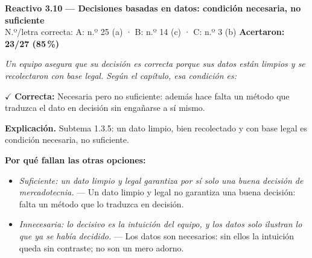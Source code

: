 \documentclass[10pt,letterpaper]{article}
\begin{document}
\begin{minipage}{\textwidth}
{\color{guinda}\textbf{Reactivo 3.10}} \textbf{— Decisiones basadas en datos: condición necesaria, no suficiente}\\[-1pt]
{\scriptsize N.º/letra correcta: A: n.º 25 (a) · B: n.º 14 (c) · C: n.º 3 (b) \hfill \textbf{Acertaron: 23/27 (85\,\%)}}

\textit{Un equipo asegura que su decisión es correcta porque sus datos están limpios y se recolectaron con base legal. Según el capítulo, esa condición es:}

\textcolor{verde}{$\checkmark$} \textbf{Correcta:} Necesaria pero no suficiente: además hace falta un método que traduzca el dato en decisión sin engañarse a sí mismo.

\textbf{Explicación.} Subtema 1.3.5: un dato limpio, bien recolectado y con base legal es condición necesaria, no suficiente.

\textbf{Por qué fallan las otras opciones:}
\begin{itemize}[itemsep=0pt,topsep=1pt,leftmargin=1.3em,parsep=0pt]
\item[\textcolor{rojo}{$\times$}] \textit{Suficiente: un dato limpio y legal garantiza por sí solo una buena decisión de mercadotecnia.} --- Un dato limpio y legal no garantiza una buena decisión: falta un método que lo traduzca en decisión.
\item[\textcolor{rojo}{$\times$}] \textit{Innecesaria: lo decisivo es la intuición del equipo, y los datos solo ilustran lo que ya se había decidido.} --- Los datos son necesarios: sin ellos la intuición queda sin contraste; no son un mero adorno.
\end{itemize}
\end{minipage}\par\vspace{5pt}{\color{gray!40}\hrule}\vspace{5pt}
\end{document}
